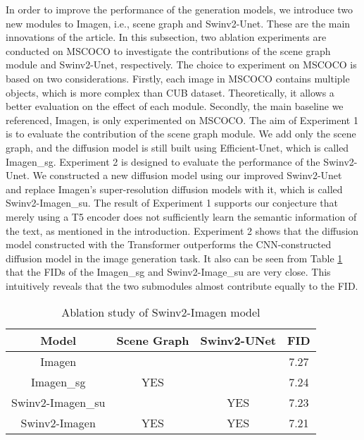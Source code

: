 \documentclass{article}
\begin{document}
In order to improve the performance of the generation models, we introduce two new modules to Imagen, i.e., scene graph and Swinv2-Unet. These are the main innovations of the article. In this subsection, two ablation experiments are conducted on MSCOCO to investigate the contributions of the scene graph module and Swinv2-Unet, respectively. The choice to experiment on MSCOCO is based on two considerations. Firstly, each image in MSCOCO contains multiple objects, which is more complex than CUB dataset. Theoretically, it allows a better evaluation on the effect of each module. Secondly, the main baseline we referenced, Imagen, is only experimented on MSCOCO. The aim of Experiment 1 is to evaluate the contribution of the scene graph module. We add only the scene graph, and the diffusion model is still built using Efficient-Unet, which is called Imagen\_sg. Experiment 2 is designed to evaluate the performance of the Swinv2-Unet. We constructed a new diffusion model using our improved Swinv2-Unet and replace Imagen's super-resolution diffusion models with it, which is called Swinv2-Imagen\_su. The result of Experiment 1 supports our conjecture that merely using a T5 encoder does not sufficiently learn the semantic information of the text, as mentioned in the introduction. Experiment 2 shows that the diffusion model constructed with the Transformer outperforms the CNN-constructed diffusion model in the image generation task. It also can be seen from Table \ref{tab:ablationstudy} that the FIDs of the Imagen\_sg and Swinv2-Image\_su are very close. This intuitively reveals that the two submodules almost contribute equally to the FID.

\begin{table}[!h]
    \centering
    \begin{tabular}{|c|c|c|c|}
    \hline
    \textbf{Model} & \textbf{Scene Graph} & \textbf{Swinv2-UNet} & \textbf{FID}\\
    \hline
     Imagen & ~ & ~ & 7.27 \\
     Imagen\_sg & YES & ~ & 7.24 \\
     Swinv2-Imagen\_su & ~ & YES & 7.23 \\
     Swinv2-Imagen & YES & YES & 7.21 \\
     \hline
    \end{tabular}
    \caption{Ablation study of Swinv2-Imagen model}
    \label{tab:ablationstudy}
\end{table}
\end{document}
